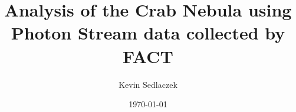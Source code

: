 \documentclass[
  tucolor,
  BCOR=12mm,     %
  parskip=half,  %
  open=any,      %
  cleardoublepage=plain,  %
]{tudothesis}
\author{Kevin Sedlaczek}
\title{Analysis of the Crab Nebula using Photon Stream data collected by FACT}
\date{\today}
\begin{document}
\frontmatter
% 
\maketitle

\makecorrectorpage


\tableofcontents

\mainmatter










% 


\appendix


\backmatter
\printbibliography

\cleardoublepage

\end{document}
